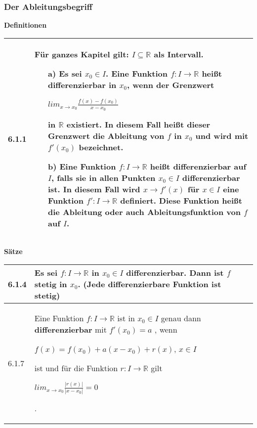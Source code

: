 \subsubsection{Der Ableitungsbegriff}

    \noindent
    \textbf{Definitionen}
      
    \begin{longtable}{p{1cm} p{16cm}}
        \toprule

        6.1.1 & Für ganzes Kapitel gilt: $I \subseteq \mathbb{R}$ als Intervall.
                \begin{itemize}[topsep=-0.5cm]
                    \item[a)] Es sei $x_0 \in I$. Eine Funktion $f: I \rightarrow \mathbb{R}$ heißt differenzierbar in $x_0$, wenn der Grenzwert 
                                \centerline{$lim_{x \rightarrow x_0} \frac{f(x)-f(x_0)}{x-x_0}$}
                                in $\mathbb{R}$ existiert. In diesem Fall heißt dieser Grenzwert die \textbf{Ableitung} von $f$ in $x_0$ und wird 
                                mit \textbf{$f'(x_0)$} bezeichnet.
                    \item[b)] Eine Funktion $f: I \rightarrow \mathbb{R}$ heißt \textbf{differenzierbar} auf $I$, falls sie in allen Punkten
                                $x_0 \in I$ differenzierbar ist. In diesem Fall wird $x \rightarrow f'(x)$  für $x \in I$ eine Funktion 
                                $f': I \rightarrow \mathbb{R}$ definiert. Diese Funktion heißt die \textbf{Ableitung} oder auch 
                                \textbf{Ableitungsfunktion} von $f$ auf $I$.
                \end{itemize} \vspace{-0cm} \\

        \bottomrule

    \end{longtable}
    

    \noindent 
    \textbf{Sätze}
    
    \begin{longtable}{p{1cm} p{16cm}}
        \toprule

        6.1.4 & Es sei $f: I \rightarrow \mathbb{R}$ in $x_0 \in I$ differenzierbar. Dann ist $f$ \textbf{stetig} in $x_0$. \hfill \break
                (Jede differenzierbare Funktion ist stetig) \\
        \midrule
        6.1.7 & Eine Funktion $f: I \rightarrow \mathbb{R}$ ist in $x_0 \in I$ genau dann \textbf{differenzierbar} mit $f'(x_0)=a$
                , wenn \hfill \break
                \centerline{$f(x) = f(x_0) + a(x-x_0)+r(x)$, $x \in I$}
                ist und für die Funktion $r: I \rightarrow \mathbb{R}$ gilt \hfill \break
                \centerline{$lim_{x \rightarrow x_0}\frac{|r(x)|}{|x-x_0|} = 0$}. \\

        \bottomrule
    \end{longtable}
    

